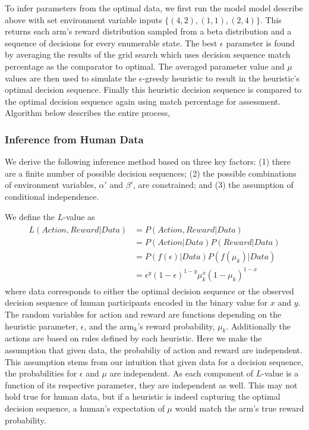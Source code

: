 To infer parameters from the optimal data, we first run the model model describe above with set environment variable inputs $\{(4,2), (1,1), (2,4)\}$. This returns each arm's reward distribution sampled from a beta distribution and a sequence of decisions for every enumerable state. The best $\epsilon$ parameter is found by averaging the results of the grid search which uses decision sequence match percentage as the comparator to optimal. The averaged parameter value and $\mu$ values are then used to simulate the $\epsilon$-greedy heuristic to result in the heuristic's optimal decision sequence. Finally this heuristic decision sequence is compared to the optimal decision sequence again using match percentage for assessment.
Algorithm below describes the entire process,

\subsubsection{Inference from Human Data}
We derive the following inference method based on three key factors: (1) there are a finite number of possible decision sequences; (2) the possible combinations of environment variables, $\alpha'$ and $\beta'$, are constrained; and (3) the assumption of conditional independence.

We define the $L$-value as 
\begin{align}
\begin{split}
	\label{eq:likelihood}
	L(Action,Reward|Data) &= P(Action,Reward|Data) \\
						  &= P(Action|Data) P(Reward|Data) \\
						  &= P(f(\epsilon)|Data) P(f(\mu_k)|Data) \\
						  &= \epsilon^y (1-\epsilon)^{1-y} \mu_k^x (1-\mu_k)^{1-x}
\end{split}
\end{align}
where data corresponds to either the optimal decision sequence or the observed decision sequence of human participants encoded in the binary value for $x$ and $y$. The random variables for action and reward are functions depending on the heuristic parameter, $\epsilon$, and the arm$_k$'s reward probability, $\mu_k$. Additionally the actions are based on rules defined by each heuristic. Here we make the assumption that given data, the probabiliy of action and reward are independent. This assumption stems from our intuition that given data for a decision sequence, the probabilities for $\epsilon$ and $\mu$ are independent. As each component of $L$-value is a function of its respective parameter, they are independent as well. This may not hold true for human data, but if a heuristic is indeed capturing the optimal decision sequence, a human's expectation of $\mu$ would match the arm's true reward probability.

